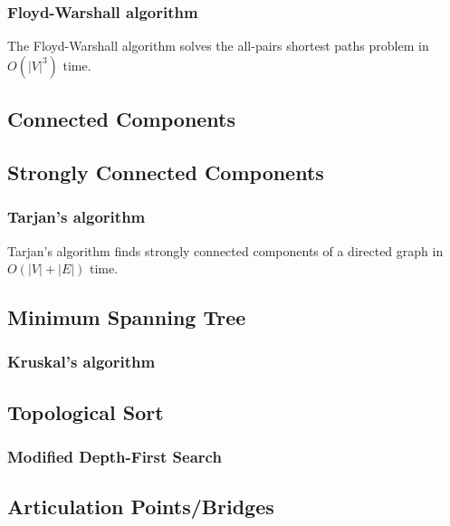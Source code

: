\documentclass[11pt,a4paper,titlepage]{article}
\begin{document}
			\subsubsection{Floyd-Warshall algorithm}
				The Floyd-Warshall algorithm solves the all-pairs shortest paths problem in $O(|V|^3)$ time.
				
		\subsection{Connected Components}
		\subsection{Strongly Connected Components}
			\subsubsection{Tarjan's algorithm}
				Tarjan's algorithm finds strongly connected components of a directed graph in $O(|V|+|E|)$ time.
				
		\subsection{Minimum Spanning Tree}
			\subsubsection{Kruskal's algorithm}
				
		\subsection{Topological Sort}
			\subsubsection{Modified Depth-First Search}
				
		\subsection{Articulation Points/Bridges}
\end{document}
